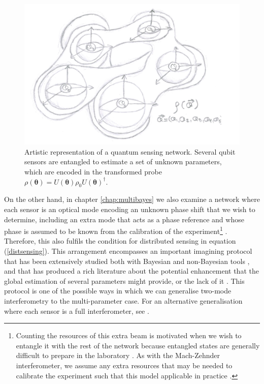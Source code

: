 \begin{figure}[t]
\centering
\includegraphics[trim={0cm 0.5cm 0cm 0.25cm},clip,width=14cm]{pictures/ch2_fig2}
\caption[Artistic representation of a quantum sensing network]{Artistic representation of a quantum sensing network. Several qubit sensors are entangled to estimate a set of unknown parameters, which are encoded in the transformed probe $\rho(\boldsymbol{\theta}) = U(\boldsymbol{\theta}) \rho_0 U(\boldsymbol{\theta})^\dagger$.}
\end{figure}

On the other hand, in chapter \ref{chap:multibayes} we also examine a network where each sensor is an optical mode encoding an unknown phase shift that we wish to determine, including an extra mode that acts as a phase reference and whose phase is assumed to be known from the calibration of the experiment\footnote{Counting the resources of this extra beam is motivated when we wish to entangle it with the rest of the network because entangled states are generally difficult to prepare in the laboratory \cite{proctor2017networked}. As with the Mach-Zehnder interferometer, we assume any extra resources that may be needed to calibrate the experiment such that this model applicable in practice \cite{jarzyna2012, proctor2017networked}.} \cite{proctor2017networked}. Therefore, this also fulfils the condition for distributed sensing in equation (\ref{distsensing}). This arrangement encompasses an important imagining protocol that has been extensively studied both with Bayesian \cite{chiara2003, spagnolo2012} and non-Bayesian tools \cite{spagnolo2012, humphreys2013}, and that has produced a rich literature about the potential enhancement that the global estimation of several parameters might provide, or the lack of it \cite{humphreys2013, knott2016local, proctor2017networked, proctor2017networkedshort, altenburg2018}. This protocol is one of the possible ways in which we can generalise two-mode interferometry to the multi-parameter case. For an alternative generalisation where each sensor is a full interferometer, see \cite{knott2016local}.

